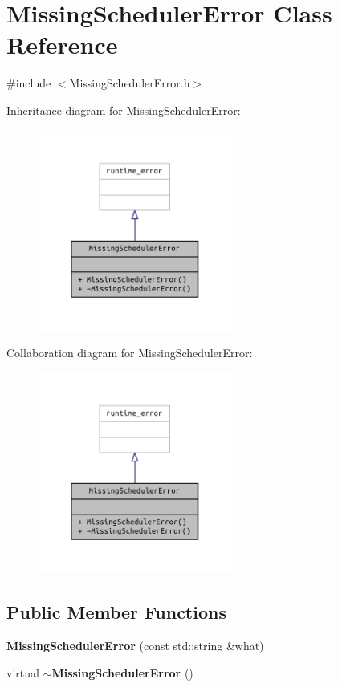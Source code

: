 \section{Missing\+Scheduler\+Error Class Reference}
\label{class_missing_scheduler_error}


{\ttfamily \#include $<$Missing\+Scheduler\+Error.\+h$>$}



Inheritance diagram for Missing\+Scheduler\+Error\+:
\nopagebreak
\begin{figure}[H]
\begin{center}
\leavevmode
\includegraphics[width=180pt]{class_missing_scheduler_error__inherit__graph}
\end{center}
\end{figure}


Collaboration diagram for Missing\+Scheduler\+Error\+:
\nopagebreak
\begin{figure}[H]
\begin{center}
\leavevmode
\includegraphics[width=180pt]{class_missing_scheduler_error__coll__graph}
\end{center}
\end{figure}
\subsection*{Public Member Functions}
\begin{DoxyCompactItemize}
\item 
{\bf Missing\+Scheduler\+Error} (const std\+::string \&what)
\item 
virtual {\bf $\sim$\+Missing\+Scheduler\+Error} ()
\end{DoxyCompactItemize}


